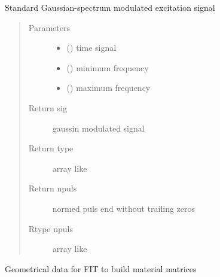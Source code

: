 \documentclass[letterpaper,10pt,english]{sphinxmanual}
\begin{document}
\begin{fulllineitems}
\begin{fulllineitems}
\begin{description}
\end{description}

\end{fulllineitems}


\begin{fulllineitems}
\label{\detokenize{FIT:FIT.FIT.gaussin}}
Standard Gaussian-spectrum modulated excitation signal
\begin{quote}\begin{description}
\item[{Parameters}] \leavevmode\begin{itemize}
\item {} 
 () \textendash{} time signal

\item {} 
 () \textendash{} minimum frequency

\item {} 
 () \textendash{} maximum frequency

\end{itemize}

\item[{Return sig}] \leavevmode
gaussin modulated signal

\item[{Return type}] \leavevmode
array like

\item[{Return npuls}] \leavevmode
normed puls end without trailing zeros

\item[{Rtype npuls}] \leavevmode
array like

\end{description}\end{quote}

\end{fulllineitems}


\begin{fulllineitems}
\label{\detokenize{FIT:FIT.FIT.geomMatrices}}
Geometrical data for FIT to build material matrices


\end{fulllineitems}
\end{fulllineitems}
\end{document}
